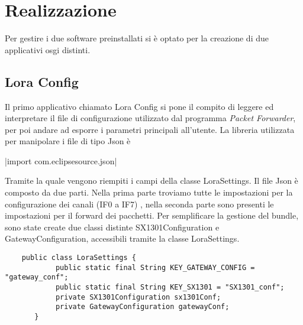 \section{Realizzazione}

Per gestire i due software preinstallati si è optato per la creazione di due
applicativi osgi distinti.
\subsection{Lora Config}
Il primo applicativo chiamato Lora Config si pone il compito di leggere ed
interpretare il file di configurazione utilizzato dal programma \emph{Packet
Forwarder}, per poi andare ad esporre i parametri principali all'utente.
La libreria utilizzata per manipolare i file di tipo Json è 

|import com.eclipsesource.json|

Tramite la quale vengono riempiti i campi della classe LoraSettings. Il file
Json è composto da due parti. Nella prima parte
troviamo tutte le impostazioni per la configurazione dei canali (IF0 a IF7)
, nella seconda
parte sono presenti le impostazioni per il forward dei pacchetti. 
Per semplificare la gestione del bundle, sono state create due classi distinte
SX1301Configuration e GatewayConfiguration, accessibili tramite la classe LoraSettings.

\begin{verbatim}
    public class LoraSettings {
            public static final String KEY_GATEWAY_CONFIG = "gateway_conf";
            public static final String KEY_SX1301 = "SX1301_conf";
            private SX1301Configuration sx1301Conf;
            private GatewayConfiguration gatewayConf;
       } 
\end{verbatim}

